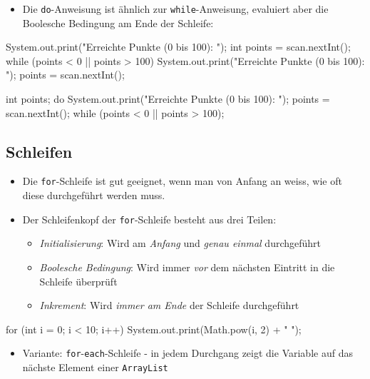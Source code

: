 \documentclass[a4paper,10pt, dvipsnames]{report}
\newcommand{\javaInLine}[1]{\texttt{#1}}
\begin{document}
\begin{itemize}
    \item Die \javaInLine{do}-Anweisung ist ähnlich zur \javaInLine{while}-Anweisung, evaluiert aber die Boolesche Bedingung am Ende der Schleife:
\end{itemize}

\begin{javacodebox}
System.out.print("Erreichte Punkte (0 bis 100): ");
int points = scan.nextInt();
while (points < 0 || points > 100) {
    System.out.print("Erreichte Punkte (0 bis 100): ");
    points = scan.nextInt();
}
\end{javacodebox}

\begin{javacodebox}
int points;
do {
    System.out.print("Erreichte Punkte (0 bis 100): ");
    points = scan.nextInt();
} while (points < 0 || points > 100);
\end{javacodebox}

\subsection{Schleifen}

\begin{itemize}
    \item Die \javaInLine{for}-Schleife ist gut geeignet, wenn man von Anfang an weiss, wie oft diese durchgeführt werden muss.
    \item Der Schleifenkopf der \javaInLine{for}-Schleife besteht aus drei Teilen:
    \begin{itemize}
        \item \textit{Initialisierung}: Wird am \textit{Anfang} und \textit{genau einmal} durchgeführt
        \item \textit{Boolesche Bedingung}: Wird immer \textit{vor} dem nächsten Eintritt in die Schleife überprüft
        \item \textit{Inkrement}: Wird \textit{immer am Ende} der Schleife durchgeführt
    \end{itemize}
\end{itemize}

\begin{javacodebox}
for (int i = 0; i < 10; i++)
    System.out.print(Math.pow(i, 2) + " ");
\end{javacodebox}

\begin{itemize}
    \item Variante: \javaInLine{for}-\javaInLine{each}-Schleife - in jedem Durchgang zeigt die Variable auf das nächste Element einer \javaInLine{ArrayList}
\end{itemize}
\end{document}
